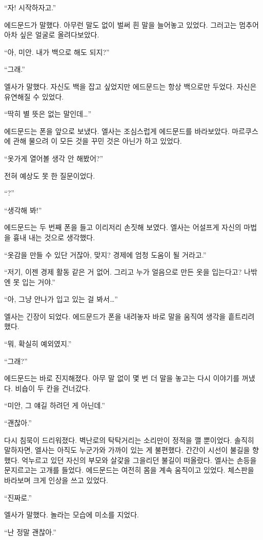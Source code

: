 ``자! 시작하자고.''

에드문드가 말했다. 아무런 말도 없이 벌써 흰 말을 늘어놓고 있었다. 그러고는 멈추어 아차 싶은 얼굴로 올려다보았다.

``아, 미안. 내가 백으로 해도 되지?''

``그래.''

엘사가 말했다. 자신도 백을 잡고 싶었지만 에드문드는 항상 백으로만 두었다. 자신은 유연해질 수 있었다.

``딱히 별 뜻은 없는 말인데\ldots''

에드문드는 폰을 앞으로 보냈다. 엘사는 조심스럽게 에드문드를 바라보았다. 마르쿠스에 관해 물으려 이 모든 것을 꾸민 것은 아닌가 하고 있었다.

``옷가게 열어볼 생각 안 해봤어?''

전혀 예상도 못 한 질문이었다.

``?''

``생각해 봐!''

에드문드는 두 번째 폰을 들고 이리저리 손짓해 보였다. 엘사는 어설프게 자신의 마법을 흉내 내는 것으로 생각했다.

``옷감을 만들 수 있단 거잖아, 맞지? 경제에 엄청 도움이 될 거라고.''

``저기, 이젠 경제 활동 같은 거 없어. 그리고 누가 얼음으로 만든 옷을 입는다고? 나밖엔 못 입는 거야.''

``아, 그냥 안나가 입고 있는 걸 봐서\ldots''

엘사는 긴장이 되었다. 에드문드가 폰을 내려놓자 바로 말을 움직여 생각을 흩트리려 했다.

``뭐, 확실히 예외였지.''

``그래?''

에드문드는 바로 진지해졌다. 아무 말 없이 몇 번 더 말을 놓고는 다시 이야기를 꺼냈다. 비숍이 두 칸을 건너갔다.

``미안, 그 얘길 하려던 게 아닌데.''

``괜찮아.''

다시 침묵이 드리워졌다. 벽난로의 탁탁거리는 소리만이 정적을 깰 뿐이었다. 솔직히 말하자면, 엘사는 아직도 누군가와 가까이 있는 게 불편했다. 간간이 시선이 불길을 향했다. 억누르고 있던 자신의 부모와 살갗을 그을리던 불길이 떠올랐다. 엘사는 손등을 문지르고는 고개를 들었다. 에드문드는 여전히 몸을 계속 움직이고 있었다. 체스판을 바라보며 크게 인상을 쓰고 있었다.

``진짜로.''

엘사가 말했다. 놀라는 모습에 미소를 지었다.

``난 정말 괜찮아.''

